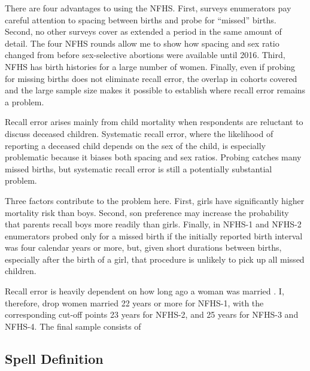 \documentclass[12pt,letterpaper]{article}
\begin{document}
There are four advantages to using the NFHS.
First, surveys enumerators pay careful attention to spacing between births and
probe for ``missed'' births.
Second, no other surveys cover as extended a period in the same amount of detail.
The four NFHS rounds allow me to show how spacing and 
sex ratio changed from before sex-selective abortions were available until 2016.
Third, NFHS has birth histories for a large number of women.
Finally, even if probing for missing births does not eliminate recall error,   
the overlap in cohorts covered and the large sample size makes it possible 
to establish where recall error remains a problem.

Recall error arises mainly from child mortality when respondents are 
reluctant to discuss deceased children.
Systematic recall error, where the likelihood of reporting a deceased 
child depends on the sex of the child, is especially problematic because 
it biases both spacing and sex ratios.
Probing catches many missed births, but systematic recall error is 
still a potentially substantial problem.

Three factors contribute to the problem here.
First, girls have significantly higher mortality risk than boys.
Second, son preference may increase the probability that parents recall boys 
more readily than girls.
Finally, in NFHS-1 and NFHS-2 enumerators probed only for a missed birth if the
initially reported birth interval was four calendar years or more,
but, given short durations between births, especially after the birth of a girl,
that procedure is unlikely to pick up all missed children.

Recall error is heavily dependent on how long ago a woman was married 
\citep{Portner2018b}.
I, therefore, drop women married 22 years or more 
for NFHS-1, with the corresponding cut-off points 23 years for NFHS-2, 
and 25 years for NFHS-3 and NFHS-4.
The final sample consists of 



\subsection{Spell Definition\label{sec:spell_def}}
\end{document}
